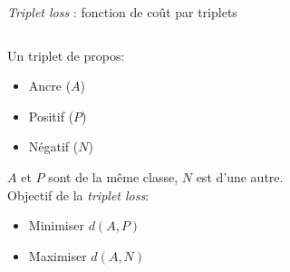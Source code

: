 \documentclass[11pt,aspectratio=169]{beamer}
\begin{document}
\begin{frame}{\textsl{Triplet loss} : fonction de coût par triplets}

\begin{columns}
    \begin{column}{0.3\linewidth}
        Un triplet de propos:
            \begin{itemize}
                \item Ancre ($A$)
                \item Positif ($P$)
                \item Négatif ($N$)
            \end{itemize}
        \vspace{0.5cm}

        $A$ et $P$ sont de la même classe, $N$ est d'une autre.\\

        \vspace{0.5cm}
        Objectif de la \textsl{triplet loss}: 
        \begin{itemize}
        \item Minimiser \textcolor{roose}{$d(A,P)$}
        \item Maximiser \textcolor{roose}{$d(A,N)$}
        \end{itemize}
    \end{column}
    \begin{column}{0.65\linewidth}
\end{column}
\end{columns}
\end{frame}
\end{document}
